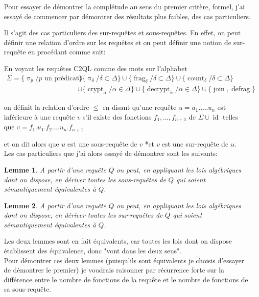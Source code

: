 \documentclass[french]{article}
\DeclareMathOperator{\proj}{\pi}
\DeclareMathOperator{\sel}{\sigma}
\DeclareMathOperator{\frag}{frag}
\DeclareMathOperator{\defrag}{defrag}
\DeclareMathOperator{\crypt}{crypt}
\DeclareMathOperator{\decrypt}{decrypt}
\DeclareMathOperator{\id}{id}
\DeclareMathOperator{\join}{join}
\newcommand{\projDelta}{\proj_{\delta}}
\newcommand{\selP}{\sel_p}
\newcommand{\fragDelta}{\frag_{\delta}}
\newtheorem{theorem}{Lemme}
\begin{document}
Pour essayer de démontrer la complétude au sens du premier critère, formel,
j'ai essayé de commencer par démontrer des résultats plus faibles, des cas particuliers.

Il s'agit des cas particuliers des sur-requêtes et sous-requêtes.
En effet, on peut définir une relation d'ordre sur les requêtes et on peut définir
une notion de sur-requête en procédant comme suit:

En voyant les requêtes C2QL comme des mots sur l'alphabet
\begin{align*}
\Sigma = \{ \selP / \text{$p$ un prédicat} \}
&\cup \{ \projDelta / \delta \subset \Delta  \}
\cup \{ \fragDelta / \delta \subset \Delta  \} 
\cup \{ \operatorname{count}_\delta / \delta \subset \Delta  \} \\
&\cup \{ \crypt_\alpha / \alpha \in \Delta  \}
\cup \{ \decrypt_\alpha / \alpha \in \Delta  \}
\cup \{ \join, \defrag \}
\end{align*}



on définit la relation d'ordre $\le$ en disant qu'une requête
$u = u_1.\dots.u_n$ est inférieure à une requête $v$
s'il existe des fonctions $f_1, \dots, f_{n+1}$ de $\Sigma \cup \id$
telles que $v = f_1.u_1.f_2\dots.u_n.f_{n+1}$ 

et on dit alors que
$u$ est une sous-requête de $v$
*et $v$ est une sur-requête de $u$. \\

Les cas particuliers que j'ai alors essayé de démontrer sont les suivants:
\begin{theorem}
	A partir d'une requête $Q$ on peut,
	en appliquant les lois algébriques dont on dispose,
	en dériver toutes les sous-requêtes de $Q$ qui soient
	sémantiquement équivalentes à $Q$.
\end{theorem}

\begin{theorem}
	A partir d'une requête $Q$ on peut,
	en appliquant les lois algébriques dont on dispose,
	en dériver toutes les sur-requêtes de $Q$ qui soient
	sémantiquement équivalentes à $Q$.
\end{theorem}

Les deux lemmes sont en fait équivalents, car toutes les lois dont on dispose
établissent des équivalence, donc "vont dans les deux sens". \\

Pour démontrer ces deux lemmes (puisqu'ils sont équivalents je choisis
d'essayer de démontrer le premier) je voudrais raisonner par récurrence forte
sur la différence entre le nombre de fonctions de la requête et le nombre de
fonctions de sa sous-requête.
\end{document}

